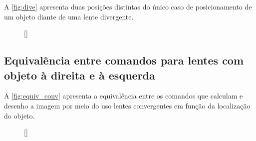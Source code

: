 \documentclass[a4paper,10pt]{article}
\begin{document}
A \autoref{fig:dive} apresenta duas posições distintas do único caso de posicionamento de um objeto diante de uma lente divergente.

\begin{figure}[!ht]
  \centering
  \begin{minipage}[c]{0.45\linewidth}
  \end{minipage} %
  \begin{minipage}[c]{0.45\linewidth}
  \end{minipage}
  [\linewidth]{
    \quad\quad\quad
  }
\end{figure}

\subsection{Equivalência entre comandos para lentes com objeto à direita e à esquerda}

A \autoref{fig:equiv_conv} apresenta a equivalência entre os comandos que calculam e desenho a imagem por meio do uso lentes convergentes em função da localização do objeto.

\begin{figure}[!ht]
  \centering
  \begin{minipage}[c]{0.45\linewidth}
  \end{minipage} %
  \begin{minipage}[c]{0.45\linewidth}
  \end{minipage}
  [\linewidth]{
    \hfill
  }
\end{figure}
\end{document}
